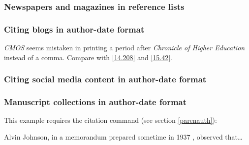 \documentclass[11pt,letterpaper,oneside]{article}
\begin{document}
\subsubsection{Newspapers and magazines in reference lists}

\begin{citeref}
\item \parencite{nytimes2002}
\end{citeref}

\setcounter{subsubsection}{50}
\subsubsection{Citing blogs in author-date format}
\label{15.51}

\textit{CMOS} seems mistaken in printing a period after
\textit{Chronicle of Higher Education} instead of a comma. Compare
with \ref{14.208} and \ref{15.42}.

\begin{citeref}
\item \parencite{germano2017}
\end{citeref}

\subsubsection{Citing social media content in author-date format}
\label{15.52}

\begin{citeref}
\item \parencite{diaz2016}
\item \parencite{brien2015}
\item \parencite{chicago2015}
\end{citeref}

\setcounter{subsubsection}{53}
\subsubsection{Manuscript collections in author-date format}
\label{15.54}

This example requires the  citation command (see
section \ref{parenauth}):

\begin{citeref}
\item Alvin Johnson, in a memorandum prepared sometime in 1937
, observed that\ldots
\end{citeref}
\end{document}
